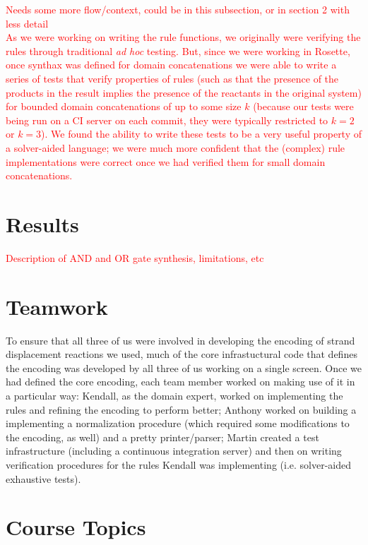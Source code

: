 \documentclass{article}
\begin{document}
\textcolor{red}{
Needs some more flow/context, could be in this subsection,
or in section 2 with less detail
\\
As we were working on writing the rule functions, we originally were
verifying the rules through traditional \emph{ad hoc} testing. But,
since we were working in Rosette, once synthax was defined for domain
concatenations we were able to write a series of tests that verify
properties of rules (such as that the presence of the products in the
result implies the presence of the reactants in the original system)
for bounded domain concatenations of up to some size $k$ (because our
tests were being run on a CI server on each commit, they were
typically restricted to $k=2$ or $k=3$). We found the ability to write
these tests to be a very useful property of a solver-aided language;
we were much more confident that the (complex) rule implementations
were correct once we had verified them for small domain
concatenations.
}


\section{Results}

\textcolor{red}{Description of AND and OR gate synthesis, limitations, etc}

\section{Teamwork}

To ensure that all three of us were involved in developing the encoding of
strand displacement reactions we used, much of the core infrastuctural code
that defines the encoding was developed by all three of us working on a single
screen. Once we had defined the core encoding, each team member worked on
making use of it in a particular way: Kendall, as the domain expert, worked
on implementing the rules and refining the encoding to perform better; Anthony
worked on building a implementing a normalization procedure (which required
some modifications to the encoding, as well) and a pretty printer/parser;
Martin created a test infrastructure (including a continuous integration server)
and then on writing verification procedures for the rules Kendall was
implementing (i.e. solver-aided exhaustive tests).

\section{Course Topics}
\end{document}
